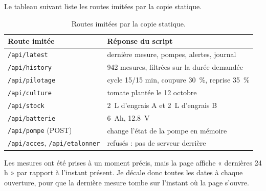 Le tableau suivant liste les routes imitées par la copie statique.

\begin{table}[H]
\centering
\small
\begin{tabularx}{\textwidth}{|l|Y|}
\hline
\textbf{Route imitée} & \textbf{Réponse du script} \\
\hline
\texttt{/api/latest} & dernière mesure, pompes, alertes, journal \\
\hline
\texttt{/api/history} & 942 mesures, filtrées sur la durée demandée \\
\hline
\texttt{/api/pilotage} & cycle 15/15 min, coupure \qty{30}{\percent}, reprise \qty{35}{\percent} \\
\hline
\texttt{/api/culture} & tomate plantée le 12 octobre \\
\hline
\texttt{/api/stock} & \qty{2}{L} d'engrais A et \qty{2}{L} d'engrais B \\
\hline
\texttt{/api/batterie} & \qty{6}{Ah}, \qty{12,8}{V} \\
\hline
\texttt{/api/pompe} (POST) & change l'état de la pompe en mémoire \\
\hline
\texttt{/api/acces}, \texttt{/api/etalonner} & refusés : pas de serveur derrière \\
\hline
\end{tabularx}
\caption{Routes imitées par la copie statique.}
\end{table}

Les mesures ont été prises à un moment précis, mais la page affiche « dernières 24 h » par rapport à l'instant présent. Je décale donc toutes les dates à chaque ouverture, pour que la dernière mesure tombe sur l'instant où la page s'ouvre.

